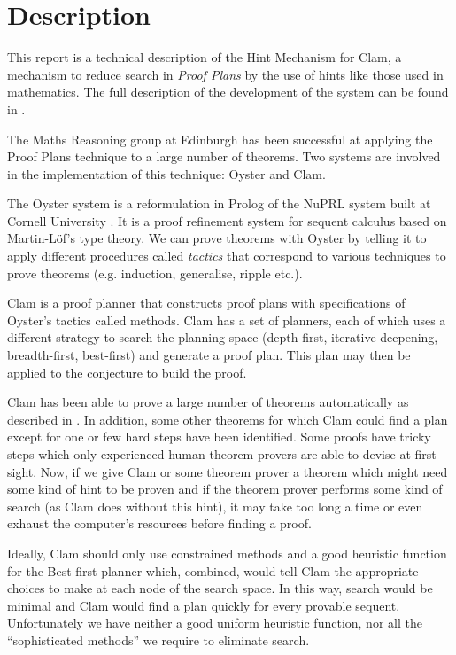 \section{Description}


        This report is a technical description of the Hint Mechanism for
Clam, a mechanism to reduce search in {\em Proof Plans} by the use of
hints like those used in mathematics. The full description of the
development of the system can be found in \cite{negrete-msc}.

        The Maths Reasoning group at Edinburgh has been successful at
applying the Proof Plans technique to a large number of theorems. Two
systems are involved in the implementation of this technique: Oyster
and Clam.

        The Oyster system is a reformulation in Prolog of the NuPRL
system built at Cornell University \cite{nuprl-book}. It is a proof
refinement system for sequent calculus based on Martin-L\"of's type
theory. We can prove theorems with Oyster by telling it to apply
different procedures called {\em tactics} that correspond to various
techniques to prove theorems (e.g. induction, generalise, ripple
etc.).

        Clam is a proof planner that constructs proof plans with
specifications of Oyster's tactics called methods. Clam has a set of
planners, each of which uses a different strategy to search the
planning space (depth-first, iterative deepening, breadth-first,
best-first) and generate a proof plan. This plan may then be applied
to the conjecture to build the proof.

        Clam has been able to prove a large number of theorems
automatically as described in \cite{pub413}. In addition, some other
theorems for which Clam could find a plan except for one or few hard
steps have been identified. Some proofs have tricky steps which only
experienced human theorem provers are able to devise at first sight.
Now, if we give Clam or some theorem prover a theorem which might need
some kind of hint to be proven and if the theorem prover performs some
kind of search (as Clam does without this hint), it may take too long
a time or even exhaust the computer's resources before finding a proof.

       Ideally, Clam should only use constrained methods and a good
heuristic function for the Best-first planner which, combined, would
tell Clam the appropriate choices to make at each node of the search
space.  In this way, search would be minimal and Clam would find a plan
quickly for every provable sequent. Unfortunately we have neither a
good uniform heuristic function, nor all the ``sophisticated methods''
we require to eliminate search.

